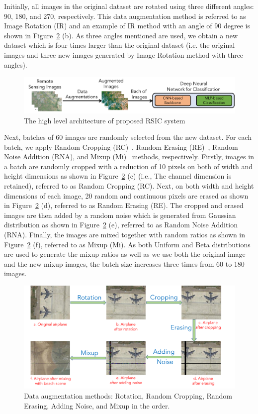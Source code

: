 \documentclass[sigconf]{acmart}
\begin{document}
Initially, all images in the original dataset are rotated using three different angles: 90, 180, and 270, respectively.
This data augmentation method is referred to as Image Rotation (IR) and an example of IR method with an angle of 90 degree is shown in Figure~\ref{fig:CAM_aug} (b).
As three angles mentioned are used, we obtain a new dataset which is four times larger than the original dataset (i.e. the original images and three new images generated by Image Rotation method with three angles).
\begin{figure}[t]
    \centering
    \includegraphics[width=1.0\linewidth]{CAM_high.pdf}
	\caption{The high level architecture of proposed RSIC system}
    \label{fig:CAM_high}
\end{figure}
Next, batches of 60 images are randomly selected from the new dataset.  
For each batch, we apply Random Cropping (RC)~\cite{rotation_aug}, Random Erasing (RE)~\cite{spec_crop}, Random Noise Addition (RNA), and Mixup (Mi)~\cite{mixup1, mixup2} methods, respectively.
Firstly, images in a batch are randomly cropped with a reduction of 10 pixels on both of width and height dimensions as shown in Figure~\ref{fig:CAM_aug} (c) (i.e., The channel dimension is retained), referred to as Random Cropping (RC).
Next, on both width and height dimensions of each image, 20 random and continuous pixels are erased as shown in Figure~\ref{fig:CAM_aug} (d), referred to as Random Erasing (RE). 
The cropped and erased images are then added by a random noise which is generated from Gaussian distribution as shown in Figure~\ref{fig:CAM_aug} (e), referred to as Random Noise Addition (RNA). 
Finally, the images are mixed together with random ratios as shown in Figure~\ref{fig:CAM_aug} (f), referred to as Mixup (Mi).
As both Uniform and Beta distributions are used to generate the mixup ratios as well as we use both the original image and the new mixup images, the batch size increases three times from 60 to 180 images.
\begin{figure}[t]
    \centering
    \includegraphics[width=1.0\linewidth]{CAM_aug.pdf}
	\caption{Data augmentation methods: Rotation, Random Cropping, Random Erasing, Adding Noise, and Mixup in the order.}
    \label{fig:CAM_aug}
\end{figure}
\end{document}
